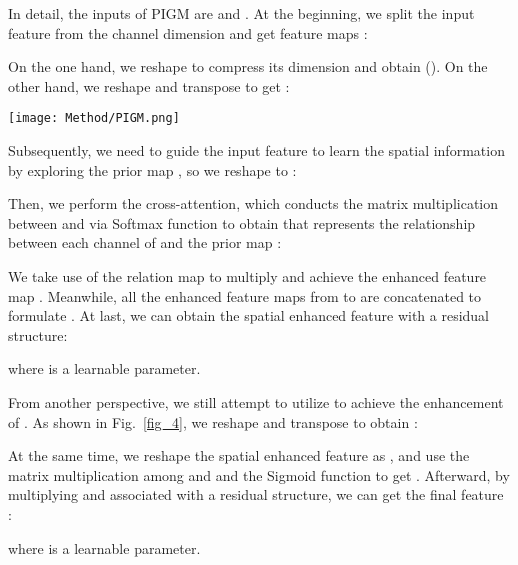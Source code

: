 \documentclass[lettersize,journal]{IEEEtran}
\begin{document}
\par
In detail, the inputs of PIGM are  and . At the beginning, we split the input feature  from the channel dimension and get  feature maps :


\par
On the one hand, we reshape  to compress its dimension and obtain  (). On the other hand, we reshape and transpose  to get :


\begin{figure*}[t]
\centering
\texttt{[image: Method/PIGM.png]}
\caption{}
\vspace{-1.0em}
\label{fig_4}
\end{figure*}

\par
Subsequently, we need to guide the input feature  to learn the spatial information by exploring the prior map , so we reshape  to :


\par
Then, we perform the cross-attention, which conducts the matrix multiplication between  and  via Softmax function to obtain  that represents the relationship between each channel of  and the prior map :

\par
We take use of the relation map  to multiply  and achieve the enhanced feature map . Meanwhile, all the enhanced feature maps from  to  are concatenated to formulate . At last, we can obtain the spatial enhanced feature  with a residual structure:

where  is a learnable parameter.
\par
From another perspective, we still attempt to utilize  to achieve the enhancement of . As shown in Fig.~\ref{fig_4}, we reshape and transpose  to obtain :

At the same time, we reshape the spatial enhanced feature  as , and use the matrix multiplication among  and  and the Sigmoid function to get . Afterward, by multiplying  and  associated with a residual structure, we can get the final feature :


where  is a learnable parameter.
\end{document}
